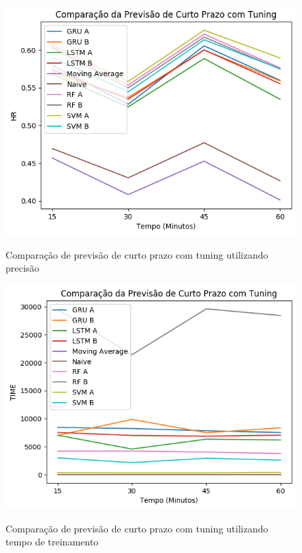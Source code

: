 \begin{figure}[htbp]
    \centering
    \includegraphics[scale=0.8]{monography/img/comparisons/comparacao_da_previsao_de_curto_prazo_com_tuning_hr.png}
    \label{figure:previsao_de_curto_prazo_com_tuning_hr}
    \caption{Comparação de previsão de curto prazo com tuning utilizando precisão}
\end{figure}

\begin{figure}[htbp]
    \centering
    \includegraphics[scale=0.8]{monography/img/comparisons/comparacao_da_previsao_de_curto_prazo_com_tuning_time.png}
    \label{figure:previsao_de_curto_prazo_com_tuning_time}
    \caption{Comparação de previsão de curto prazo com tuning utilizando tempo de treinamento}
\end{figure}

